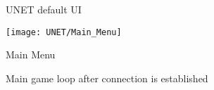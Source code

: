 \begin{figure}[p]
  \centering
  \qquad
  \qquad

  \caption{UNET default UI}
  \label{fig:unet_ui}
\end{figure}

\begin{figure}[p]
  \centering
  \texttt{[image: UNET/Main\_Menu]}
  \caption{Main Menu}
  \label{fig:main}
\end{figure}


\begin{figure}[p]
  \centering

  \qquad

  \caption{Main game loop after connection is established}
  \label{fig:in_game}
\end{figure}
